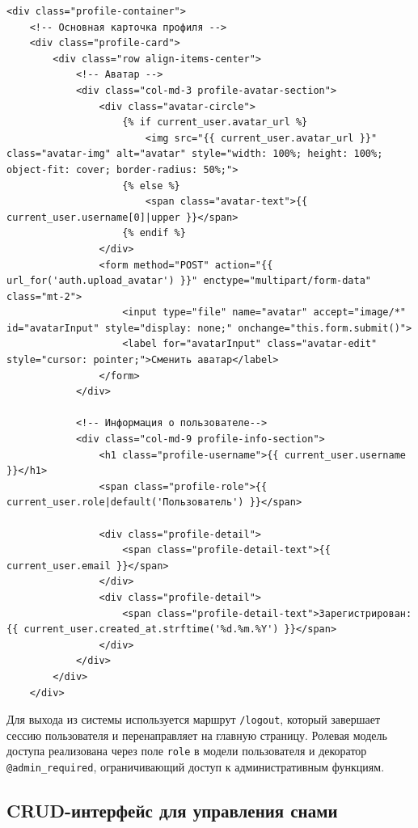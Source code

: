 \documentclass[14pt, a4paper]{extarticle}
\begin{document}
\begin{lstlisting}[caption={Шаблон страницы профиля (profile.html)}, label={lst:profile_template}]
<div class="profile-container">
    <!-- Основная карточка профиля -->
    <div class="profile-card">
        <div class="row align-items-center">
            <!-- Аватар -->
            <div class="col-md-3 profile-avatar-section">
                <div class="avatar-circle">
                    {% if current_user.avatar_url %}
                        <img src="{{ current_user.avatar_url }}" class="avatar-img" alt="avatar" style="width: 100%; height: 100%; object-fit: cover; border-radius: 50%;">
                    {% else %}
                        <span class="avatar-text">{{ current_user.username[0]|upper }}</span>
                    {% endif %}
                </div>
                <form method="POST" action="{{ url_for('auth.upload_avatar') }}" enctype="multipart/form-data" class="mt-2">
                    <input type="file" name="avatar" accept="image/*" id="avatarInput" style="display: none;" onchange="this.form.submit()">
                    <label for="avatarInput" class="avatar-edit" style="cursor: pointer;">Сменить аватар</label>
                </form>
            </div>

            <!-- Информация о пользователе-->
            <div class="col-md-9 profile-info-section">
                <h1 class="profile-username">{{ current_user.username }}</h1>
                <span class="profile-role">{{ current_user.role|default('Пользователь') }}</span>

                <div class="profile-detail">
                    <span class="profile-detail-text">{{ current_user.email }}</span>
                </div>
                <div class="profile-detail">
                    <span class="profile-detail-text">Зарегистрирован: {{ current_user.created_at.strftime('%d.%m.%Y') }}</span>
                </div>
            </div>
        </div>
    </div>

\end{lstlisting}

Для выхода из системы используется маршрут \texttt{/logout}, который завершает сессию пользователя и перенаправляет на главную страницу. Ролевая модель доступа реализована через поле \texttt{role} в модели пользователя и декоратор \texttt{@admin\_required}, ограничивающий доступ к административным функциям.

\subsection{CRUD-интерфейс для управления снами}
\end{document}
